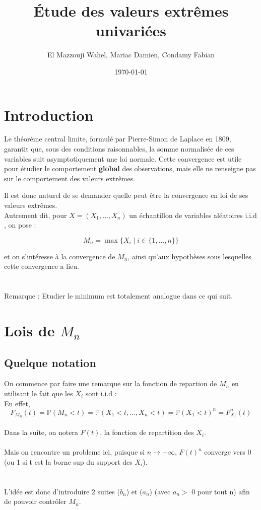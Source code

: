 \documentclass{article}
\title{Étude des valeurs extrêmes univariées}
\author{El Mazzouji Wahel, Mariac Damien, Condamy Fabian}
\date{\today}
\begin{document}
\maketitle 
\newpage
\tableofcontents 
\newpage
\section{Introduction} 

Le théorème central limite, formulé par Pierre-Simon de Laplace en 1809, garantit que, sous des conditions raisonnables, la somme normalisée de ces variables suit asymptotiquement une loi normale. Cette convergence est utile pour étudier le comportement \textbf{global} des observations, mais elle ne renseigne pas sur le comportement des valeurs extrêmes.

Il est donc naturel de se demander quelle peut être la convergence en loi de ses valeurs extrêmes. 
\\
Autrement dit, pour \( X = (X_1, ..., X_n) \) un échantillon de variables aléatoires i.i.d , on pose :


\[
M_n = \max\{X_i \mid i \in \{1, ..., n\} \}
\]

et on s'intéresse à la convergence de \( M_n \), ainsi qu'aux hypothèses sous lesquelles cette convergence a lieu.
\\
\\
\\
Remarque : Etudier le minimum est totalement analogue dans ce qui suit.

\section{Lois de $M_n$}

\subsection{Quelque notation }

On commence par faire une remarque sur la fonction de repartion de $M_n$ en utilisant le fait que les $X_i$ sont i.i.d :
\\
En effet,
\[
F_{M_n}(t) = \mathbb{P}(M_n < t) = \mathbb{P}(X_1 < t,...,X_n <t)=\mathbb{P}(X_1<t)^n = F_{X_1}^n(t) 
\]
\\
Dans la suite, on notera $F(t)$, la fonction de repartition des $X_i$.
\\
\\
Mais on rencontre un probleme ici, puisque si $n\to + \infty$, $F(t)^n$ converge vers 0 (ou 1 si t est la borne sup du support des $X_i$).
\\
\\
\\
L'idée est donc d'introduire 2 suites ($b_n$) et ($a_n$) (avec $a_n > $  0 pour tout n) afin de pouvoir contrôler $M_n$.
\end{document}
